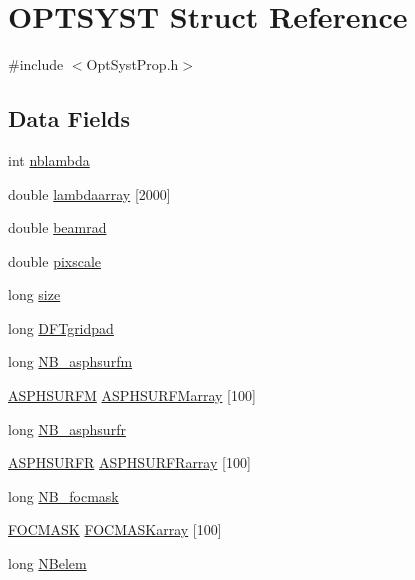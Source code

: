 \hypertarget{structOPTSYST}{\section{O\+P\+T\+S\+Y\+S\+T Struct Reference}
\label{structOPTSYST}
}


{\ttfamily \#include $<$Opt\+Syst\+Prop.\+h$>$}

\subsection*{Data Fields}
\begin{DoxyCompactItemize}
\item 
int \hyperlink{structOPTSYST_a984f1bc6e335c6ca935a7a4abc960351}{nblambda}
\item 
double \hyperlink{structOPTSYST_affffe3221582de4166398a84debc5257}{lambdaarray} \mbox{[}2000\mbox{]}
\item 
double \hyperlink{structOPTSYST_a10d097a25c01cbe9263690707182f0c8}{beamrad}
\item 
double \hyperlink{structOPTSYST_aa64373d953735e7fc898f664706ae434}{pixscale}
\item 
long \hyperlink{structOPTSYST_a1ca7a42369dc6bf1567dbeb3028c8a2a}{size}
\item 
long \hyperlink{structOPTSYST_ad30b68bcbf477c2e7348e9452a8d1693}{D\+F\+Tgridpad}
\item 
long \hyperlink{structOPTSYST_a42bf1a88cf3bc234c3ff551f7094be9e}{N\+B\+\_\+asphsurfm}
\item 
\hyperlink{structASPHSURFM}{A\+S\+P\+H\+S\+U\+R\+F\+M} \hyperlink{structOPTSYST_ab559d2b56f4502be6cc1ea69f5b55f7d}{A\+S\+P\+H\+S\+U\+R\+F\+Marray} \mbox{[}100\mbox{]}
\item 
long \hyperlink{structOPTSYST_a1d1453dfab2f1a7d2cbd8c1a0f6b0174}{N\+B\+\_\+asphsurfr}
\item 
\hyperlink{structASPHSURFR}{A\+S\+P\+H\+S\+U\+R\+F\+R} \hyperlink{structOPTSYST_aa6ed8c7ac4cc2c0aa47af3b4a585e774}{A\+S\+P\+H\+S\+U\+R\+F\+Rarray} \mbox{[}100\mbox{]}
\item 
long \hyperlink{structOPTSYST_a70fa5cf6b8805eecaa3c31e982273c02}{N\+B\+\_\+focmask}
\item 
\hyperlink{structFOCMASK}{F\+O\+C\+M\+A\+S\+K} \hyperlink{structOPTSYST_a8d4ccf0884791758d77f5488ddf93bb0}{F\+O\+C\+M\+A\+S\+Karray} \mbox{[}100\mbox{]}
\item 
long \hyperlink{structOPTSYST_ab9532e90f1fa8a506d6316eac6dfd5ce}{N\+Belem}

\end{DoxyCompactItemize}

